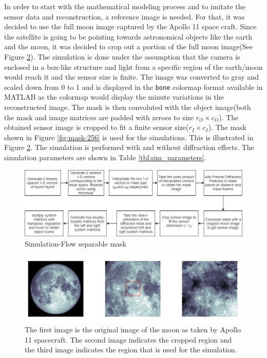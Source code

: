 In order to start with the mathematical modeling process and to imitate the sensor data and reconstruction, a reference image is needed. For that, it was decided to use the full moon image captured by the Apollo 11 space craft\cite{MoonImage}. Since the satellite is going to be pointing towards astronomical objects like the earth and the moon, it was decided to crop out a portion of the full moon image(See Figure \ref{fig:moon_image}). The simulation is done under the assumption that the camera is enclosed in a box-like structure and light from a specific region of the earth/moon would reach it and the sensor size is finite. The image was converted to gray and scaled down from 0 to 1 and is displayed in the \texttt{bone} colormap format available in MATLAB as the colormap would display the minute variations in the reconstructed image. The mask is then convoluted with the object image(both the mask and image matrices are padded with zeroes to size $r_O \times c_O$). The obtained sensor image is cropped to fit a finite sensor size($r_I \times c_I$). The mask shown in Figure \ref{fig:mask-256} is used for the simulations. 
This is illustrated in Figure \ref{fig:moon_image}. The simulation is performed with and without diffraction effects. The simulation parameters are shown in Table \ref{tbl:sim_parameters}. 

\begin{figure}[ht]
\includegraphics[width=\linewidth]{pics/sep_mask_sim_flow}
\caption{Simulation-Flow separable mask}
\label{fig:sep_sim}
\end{figure}

\begin{figure}[ht]
\includegraphics[scale = 0.50]{pics/MoonImagePortion}
\caption{The first image is the original image of the moon as taken by Apollo 11 spacecraft. The second image indicates the cropped region and the third image indicates the region that is used for the simulation.}
\label{fig:moon_image}
\end{figure}

